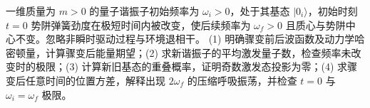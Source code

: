 一维质量为 \(m>0\) 的量子谐振子初始频率为 \(\omega_i>0\)，处于其基态 \(|0_i\rangle\)，初始时刻 \(t=0\) 势阱弹簧劲度在极短时间内被改变，使后续频率为 \(\omega_f>0\) 且质心与势阱中心不变。忽略非瞬时驱动过程与环境退相干。
(1) 明确骤变前后波函数及动力学哈密顿量，计算骤变后能量期望；(2) 求新谐振子的平均激发量子数，检查频率未改变时的极限；(3) 计算新旧基态的重叠概率，证明奇数激发态投影为零；(4) 求骤变后任意时间的位置方差，解释出现 \(2\omega_f\) 的压缩呼吸振荡，并检查 \(t=0\) 与 \(\omega_i=\omega_f\) 极限。
